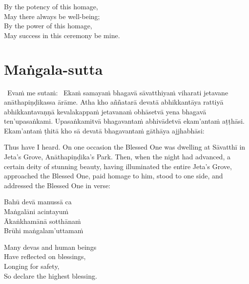 \begin{english-verses}
  By the potency of this homage,\\
  May there always be well-being;\\
  By the power of this homage,\\
  May success in this ceremony be mine.
\end{english-verses}

\suttaRef{[Thai]}

\section{Maṅgala-sutta}
\label{mangala-sutta}

\begin{pali-hangtogether}
  \anglebracketleft\ \hspace{-0.5mm}Evaṁ me sutaṁ: \hspace{-0.5mm}\anglebracketright\   Ekaṁ samayaṁ bhagavā sāvatthiyaṁ viharati jetavane anāthapiṇḍikassa ārāme. Atha kho aññatarā devatā abhikkantāya rattiyā abhikkantavaṇṇā kevalakappaṁ jetavanaṁ obhāsetvā yena bhagavā ten'upasaṅkami. Upasaṅkamitvā bhagavantaṁ abhivādetvā ekam'antaṁ aṭṭhāsi. Ekam'antaṁ ṭhitā kho sā devatā bhagavantaṁ gāthāya ajjhabhāsi:
\end{pali-hangtogether}

\begin{english-verses}
  Thus have I heard. On one occasion the Blessed One was dwelling at Sāvatthī in Jeta's Grove, Anāthapiṇḍika's Park. Then, when the night had advanced, a certain deity of stunning beauty, having illuminated the entire Jeta's Grove, approached the Blessed One, paid homage to him, stood to one side, and addressed the Blessed One in verse:
\end{english-verses}

\begin{pali-hang}
  Bahū devā manussā ca\\
  Maṅgalāni acintayuṁ\\
  Ākaṅkhamānā sotthānaṁ\\
  Brūhi maṅgalam'uttamaṁ
\end{pali-hang}

\begin{english-verses}
  Many devas and human beings\\
  Have reflected on blessings,\\
  Longing for safety,\\
  So declare the highest blessing.
\end{english-verses}


